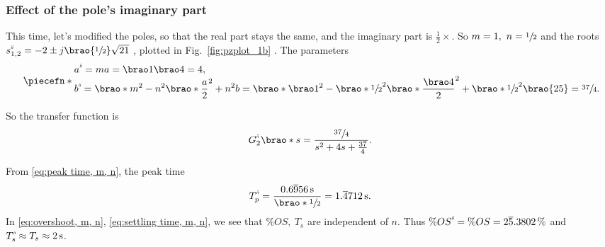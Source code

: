 \documentclass[12pt]{article}
\newcommand*\siexpr[2][]{\SI[parse-numbers=false,#1]{#2}}%
\DeclarePairedDelimiter\brao()%
\DeclarePairedDelimiter\piecefn\{.
\newcommand{\setprime}[2][1]{%
    {#2}^{%
        \raisebox{1pt}{%
            \scalebox{0.5}{%
                \itshape\sffamily\uppercase%
                \expandafter{%
                    \romannumeral#1%
                }%
            }%
        }
    }%
}%
\begin{document}
\begin{enumerate}[(a)]
        \subsubsection{Effect of the pole's imaginary part}
        This time, let's modified the poles, so that the real part stays the same, and the imaginary part is $\frac12\times$.
        So $m = 1,\ n = \sfrac12$
        and the roots $\setprime[2]s_{1,2} = -2 \pm j\brao{\sfrac12}\sqrt{21}$
        , plotted in Fig.~\ref{fig:pzplot_1b}%
        . The parameters
        \begin{equation}
            \piecefn*{
                \begin{array}{@{}l@{}}\displaystyle
                    \setprime[2]a = ma = \brao1\brao4 = 4,
                \\*\displaystyle
                      \setprime[2]b
                    = \brao*{m^2 - n^2}\brao*{\frac{a}2}^2 + n^2b
                    = \brao*{\brao1^2 - \brao*{\sfrac12}^2}\brao*{\frac{\brao4}2}^2 + \brao*{\sfrac12}^2\brao{25}
                    = \sfrac{37}4\rlap.
                \end{array}
            }
        \end{equation}

        So the transfer function is
        \begin{equation}
            \setprime[2]{G}_2\brao*s = \frac{\sfrac{37}4}{s^2 + 4s + \tfrac{37}4}.
        \end{equation}

        From \eqref{eq:peak time, m, n}, the peak time
        \begin{equation}
            \setprime[2]{T}_p = \frac{\siexpr{0.6\overline956}\second}{\brao*{\sfrac12}} = \siexpr{1.\overline4712}\second.
        \end{equation}
        In \eqref{eq:overshoot, m, n}, \eqref{eq:settling time, m, n},
        we see that $\%OS,\ T_s$ are independent of $n$.
        Thus $\%\setprime[2]{OS} = \%OS = \siexpr{2\overline5.3802}\percent$ and $\setprime[2]{T}_s \approx T_s \approx \SI2\second$.


\end{enumerate}
\end{document}
